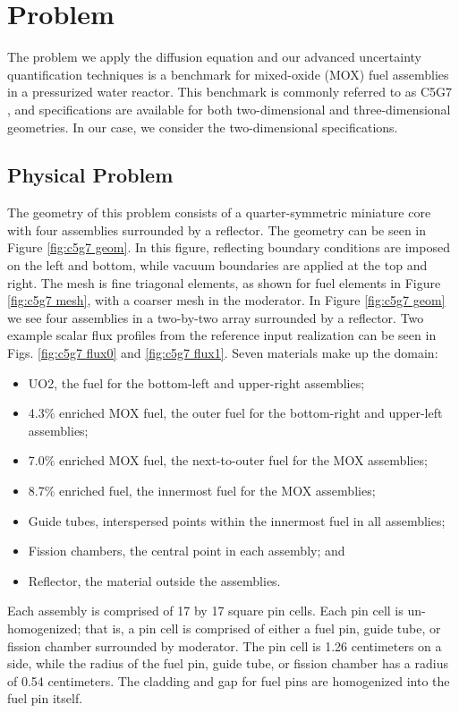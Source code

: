 \section{Problem}
The problem we apply the diffusion equation and our advanced uncertainty quantification techniques is a
benchmark for mixed-oxide (MOX) fuel assemblies in a pressurized water reactor.  This benchmark is
commonly referred to as C5G7 \cite{c5g7}, and specifications are available for both two-dimensional and three-dimensional
geometries.  In our case, we consider the two-dimensional specifications.

\subsection{Physical Problem}
The geometry of this problem consists of a quarter-symmetric miniature core with four assemblies surrounded by
a reflector.  The geometry can be seen in Figure \ref{fig:c5g7 geom}.  In this figure, reflecting boundary
conditions are imposed on the left and bottom, while vacuum boundaries are applied at the top and right.
The mesh is fine triagonal elements, as shown for fuel elements in Figure \ref{fig:c5g7 mesh}, with a coarser
mesh in the moderator.  In Figure \ref{fig:c5g7 geom} we see four assemblies in a two-by-two array surrounded
by a reflector.
Two example scalar flux profiles from the reference input realization can be seen in Figs. \ref{fig:c5g7 flux0} and
\ref{fig:c5g7 flux1}.  Seven materials make up the domain:
\begin{itemize}
  \item UO2, the fuel for the bottom-left and upper-right assemblies;
  \item 4.3\% enriched MOX fuel, the outer fuel for the bottom-right and upper-left assemblies;
  \item 7.0\% enriched MOX fuel, the next-to-outer fuel for the MOX assemblies;
  \item 8.7\% enriched fuel, the innermost fuel for the MOX assemblies;
  \item Guide tubes, interspersed points within the innermost fuel in all assemblies;
  \item Fission chambers, the central point in each assembly; and
  \item Reflector, the material outside the assemblies.
\end{itemize}
Each assembly is comprised of 17 by 17 square pin cells.
Each pin cell is un-homogenized; that is, a pin cell is comprised of either a fuel pin, guide tube, or
fission chamber surrounded by moderator.  The pin cell is 1.26 centimeters on a side, while the radius of the
fuel pin, guide tube, or fission chamber has a radius of 0.54 centimeters.  The cladding and gap for fuel
pins are homogenized into the fuel pin itself.  

